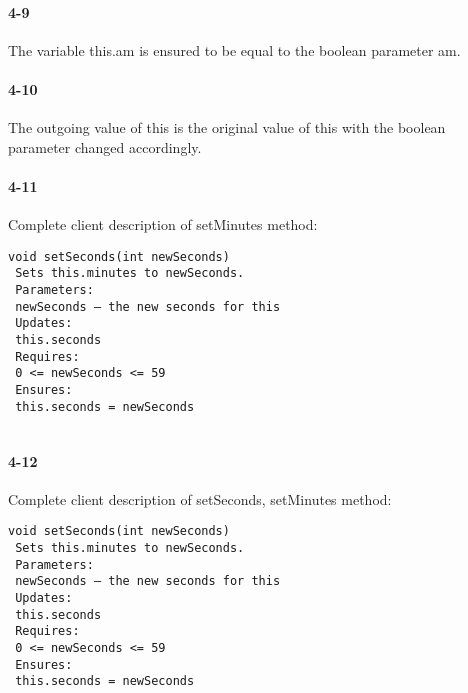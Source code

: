 \documentclass[10pt]{article}
\begin{document}
\paragraph{4-9} The variable this.am is ensured to be equal to the boolean parameter am. 

\paragraph{4-10} The outgoing value of this is the original value of this with the boolean parameter changed accordingly. 

\paragraph{4-11} Complete client description of setMinutes method: 

\begin{lstlisting}
void setSeconds(int newSeconds)
 Sets this.minutes to newSeconds.
 Parameters:
 newSeconds – the new seconds for this
 Updates:
 this.seconds
 Requires:
 0 <= newSeconds <= 59
 Ensures:
 this.seconds = newSeconds 
 

\end{lstlisting}

\paragraph{4-12} Complete client description of setSeconds, setMinutes method: 

\begin{lstlisting}
void setSeconds(int newSeconds)
 Sets this.minutes to newSeconds.
 Parameters:
 newSeconds – the new seconds for this
 Updates:
 this.seconds
 Requires:
 0 <= newSeconds <= 59
 Ensures:
 this.seconds = newSeconds 


\end{lstlisting}
\end{document}
